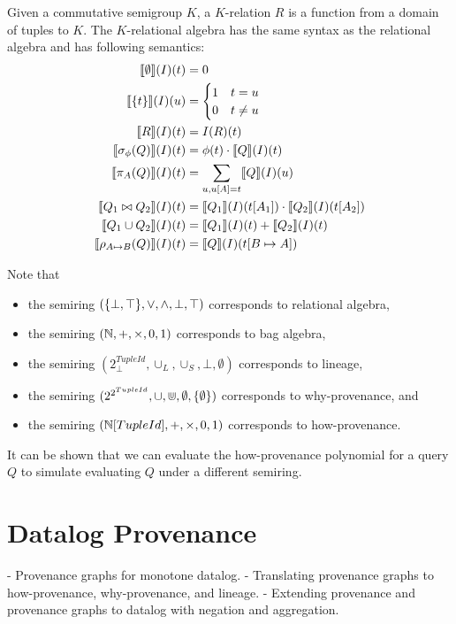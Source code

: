 \documentclass{mwhittaker}
\begin{document}
Given a commutative semigroup $K$, a $K$-relation $R$ is a function from a
domain of tuples to $K$. The $K$-relational algebra has the same syntax as the
relational algebra and has following semantics:
\begin{align*}
  \llbracket\emptyset\rrbracket(I)(t) &= 0 \\
  \llbracket\{t\}\rrbracket(I)(u) &= \begin{cases}
    1 & t = u \\
    0 & t \neq u
  \end{cases} \\
  \llbracket R\rrbracket(I)(t) &= I(R)(t) \\
  \llbracket\sigma_\phi(Q)\rrbracket(I)(t) &= \phi(t) \cdot \llbracket Q\rrbracket(I)(t) \\
  \llbracket\pi_A(Q)\rrbracket(I)(t) &= \sum_{u, u[A] = t} \llbracket Q\rrbracket(I)(u)\\
  \llbracket Q_1 \bowtie Q_2\rrbracket(I)(t) &= \llbracket Q_1\rrbracket(I)(t[A_1]) \cdot \llbracket Q_2\rrbracket(I)(t[A_2]) \\
  \llbracket Q_1 \cup Q_2\rrbracket(I)(t) &= \llbracket Q_1\rrbracket(I)(t) + \llbracket Q_2\rrbracket(I)(t) \\
  \llbracket\rho_{A \mapsto B}(Q)\rrbracket(I)(t) &= \llbracket Q\rrbracket(I)(t[B \mapsto A])
\end{align*}

Note that
\begin{itemize}
  \item
    the semiring $(\{\bot, \top\}, \lor, \land, \bot, \top)$ corresponds to
    relational algebra,
  \item
    the semiring $(\mathbb{N}, +, \times, 0, 1)$ corresponds to bag algebra,
  \item
    the semiring $(2^{TupleId}_\bot, \cup_L, \cup_S, \bot, \emptyset)$
    corresponds to lineage,
  \item
    the semiring $(2^{2^{TupleId}}, \cup, \Cup, \emptyset, \{\emptyset\})$
    corresponds to why-provenance, and
  \item
    the semiring $(\mathbb{N}[TupleId], +, \times, 0, 1)$ corresponds to
    how-provenance.
\end{itemize}

It can be shown that we can evaluate the how-provenance polynomial for a query
$Q$ to simulate evaluating $Q$ under a different semiring.

\section{Datalog Provenance}
- Provenance graphs for monotone datalog.
- Translating provenance graphs to how-provenance, why-provenance, and lineage.
- Extending provenance and provenance graphs to datalog with negation and
  aggregation.
\end{document}
